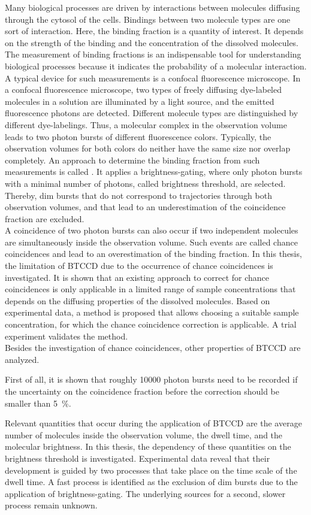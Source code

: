 Many biological processes are driven by interactions between molecules diffusing through the cy\-to\-sol of the cells. Bindings between two molecule types are one sort of interaction. Here, the binding fraction is a quantity of interest. It depends on the strength of the binding and the concentration of the dissolved molecules. The measurement of binding fractions is an indispensable tool for understanding biological processes because it indicates the probability of a molecular interaction. A typical device for such measurements is a confocal fluorescence microscope. In a confocal fluorescence microscope, two types of freely diffusing dye-labeled molecules in a solution are illuminated by a light source, and the emitted fluorescence photons are detected. Different molecule types are distinguished by different dye-labelings. Thus, a molecular complex in the observation volume leads to two photon bursts of different fluorescence colors. Typically, the observation volumes for both colors do neither have the same size nor overlap completely. An approach to determine the binding fraction from such measurements is called . It applies a brightness-gating, where only photon bursts with a minimal number of photons, called brightness threshold, are selected. Thereby, dim bursts that do not correspond to trajectories through both observation volumes, and that lead to an underestimation of the coincidence fraction are excluded. \\

A coincidence of two photon bursts can also occur if two independent molecules are simultaneously inside the observation volume. Such events are called chance coincidences and lead to an overestimation of the binding fraction. In this thesis, the limitation of \gls{BTCCD} due to the occurrence of chance coincidences is investigated. It is shown that an existing approach to correct for chance coincidences is only applicable in a limited range of sample concentrations that depends on the diffusing properties of the dissolved molecules. Based on experimental data, a method is proposed that allows choosing a suitable sample concentration, for which the chance coincidence correction is applicable. A trial experiment validates the method. \\

Besides the investigation of chance coincidences, other properties of \gls{BTCCD} are analyzed. 

First of all, it is shown that roughly \num{10000} photon bursts need to be recorded if the uncertainty on the coincidence fraction before the correction should be smaller than \SI{5}{\percent}. 

Relevant quantities that occur during the application of \gls{BTCCD} are the average number of molecules inside the observation volume, the dwell time, and the molecular brightness. In this thesis, the dependency of these quantities on the brightness threshold is investigated. Experimental data reveal that their development is guided by two processes that take place on the time scale of the dwell time. A fast process is identified as the exclusion of dim bursts due to the application of brightness-gating. The underlying sources for a second, slower process remain unknown.